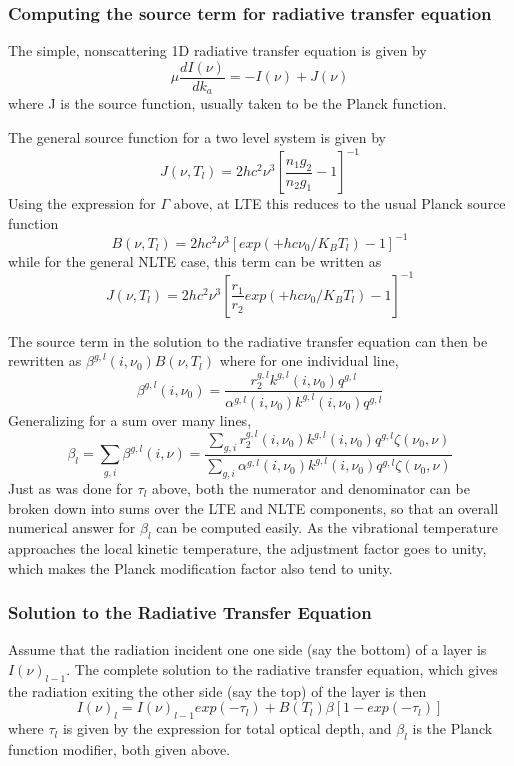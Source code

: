 \documentclass[12pt]{article}
\begin{document}
{{{{\subsubsection{Computing the source term for radiative transfer equation}

The simple, nonscattering 1D radiative transfer equation is given by
\[
\mu \frac{dI(\nu)}{dk_{a}} = -I(\nu) + J(\nu)
\]
where J is the source function, usually taken to be the Planck function.

The general source function for a two level system is given by 
\cite{edw:93,edw:98,lop:01}
\[
J(\nu,T_{l}) = 2 h c^{2} \nu^{3} [\frac{n_{1}g_{2}}{n_{2}g_{1}} - 1]^{-1}
\]
Using the expression for $\Gamma$ above, at LTE this reduces to the 
usual Planck source function 
\[
B(\nu,T_{l}) = 2 h c^{2} \nu^{3} [exp(+hc\nu_{0}/K_{B}T_{l}) - 1]^{-1}
\]
while for the general NLTE case, this term can be written as
\[
J(\nu,T_{l}) = 
   2 h c^{2} \nu^{3} [\frac{r_{1}}{r_{2}} exp(+hc\nu_{0}/K_{B}T_{l}) - 1]^{-1}
\]

The source term in the solution to the radiative transfer equation can then be
rewritten as \cite{edw:93,edw:98,lop:01,kopra} $\beta^{g,l}(i,\nu_0) 
B(\nu,T_{l})$ where for one individual line, 
\[
\beta^{g,l}(i,\nu_0) = \frac{ r_{2}^{g,l} k^{g,l}(i,\nu_0) q^{g,l}}
 {\alpha^{g,l}(i,\nu_0) k^{g,l}(i,\nu_0) q^{g,l}}
\]
Generalizing for a sum over many lines, 
\[
\beta_{l} = \sum_{g,i} \beta^{g,l}(i,\nu) =  
   \frac{ \sum_{g,i} 
       r_{2}^{g,l}(i,\nu_0) k^{g,l}(i,\nu_0) q^{g,l} \zeta(\nu_{0},\nu) } 
   {\sum_{g,i}  
     \alpha^{g,l}(i,\nu_0) k^{g,l}(i,\nu_0) q^{g,l} \zeta(\nu_{0},\nu)}
\]
Just as was done for $\tau_{l}$ above, both the numerator and denominator can
be broken down into sums over the LTE and NLTE components, so that an overall
numerical answer for $\beta_{l}$ can be computed easily.
As the vibrational temperature approaches the local kinetic temperature, the 
adjustment factor goes to unity, which makes the Planck modification factor 
also tend to unity.

\subsubsection{Solution to the Radiative Transfer Equation}
Assume that the radiation incident one one side (say the bottom) of a layer is
$I(\nu)_{l-1}$. The complete solution to the radiative transfer equation, which
gives the radiation exiting the other side (say the top) of the layer is then
\cite{edw:93,edw:98,lop:01,kopra}
\[
I(\nu)_{l} = I(\nu)_{l-1}exp(-{\tau_{l}}) 
             + B(T_{l}) \beta [1 - exp(-{\tau_{l}})]
\]
where $\tau_{l}$ is given by the expression for total optical depth, and 
$\beta_{l}$ is the Planck function modifier, both given above.

}}}}
\end{document}
